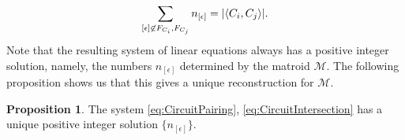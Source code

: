 \documentclass[12pt]{report}
\theoremstyle{definition}
\newtheorem{proposition}[theorem]{Proposition}
\DeclarePairedDelimiter\abs{\lvert}{\rvert}
\DeclarePairedDelimiter\iprod{\langle}{\rangle}
\def\calM{\mathcal M}
\theoremstyle{upright}
\begin{document}
\begin{equation}\label{eq:CircuitIntersection}
    \sum_{[\epsilon]\not\in F_{C_i}, F_{C_j}} n_{[\epsilon]}=\abs*{\iprod*{C_i, C_j}}.
\end{equation}
Note that the resulting system of linear equations always has a positive integer solution, namely, the numbers $n_{[\epsilon]}$ determined by the matroid $\calM$.
The following proposition shows us that this gives a unique reconstruction for $\calM$.

\begin{proposition}

    The system \eqref{eq:CircuitPairing}, \eqref{eq:CircuitIntersection} has a unique positive integer solution $\{n_{[\epsilon]}\}$.
    
\end{proposition}
\end{document}
